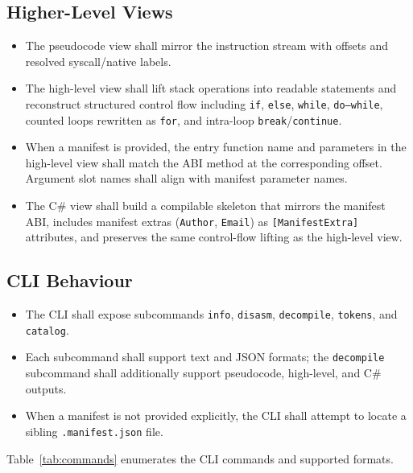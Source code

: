 \documentclass[11pt]{article}
\begin{document}
\subsection{Higher-Level Views}
\begin{itemize}[nosep]
    \item The pseudocode view shall mirror the instruction stream with offsets
    and resolved syscall/native labels.
    \item The high-level view shall lift stack operations into readable
    statements and reconstruct structured control flow including \texttt{if},
    \texttt{else}, \texttt{while}, \texttt{do--while}, counted loops rewritten
    as \texttt{for}, and intra-loop \texttt{break}/\texttt{continue}.
    \item When a manifest is provided, the entry function name and parameters
    in the high-level view shall match the ABI method at the corresponding
    offset. Argument slot names shall align with manifest parameter names.
    \item The C\# view shall build a compilable skeleton that mirrors the
    manifest ABI, includes manifest extras (\texttt{Author}, \texttt{Email}) as
    \texttt{[ManifestExtra]} attributes, and preserves the same control-flow
    lifting as the high-level view.
\end{itemize}

\subsection{CLI Behaviour}
\begin{itemize}[nosep]
    \item The CLI shall expose subcommands \texttt{info}, \texttt{disasm},
    \texttt{decompile}, \texttt{tokens}, and \texttt{catalog}.
    \item Each subcommand shall support text and JSON formats; the
    \texttt{decompile} subcommand shall additionally support pseudocode,
    high-level, and C\# outputs.
    \item When a manifest is not provided explicitly, the CLI shall attempt to
    locate a sibling \texttt{.manifest.json} file.
\end{itemize}

Table~\ref{tab:commands} enumerates the CLI commands and supported formats.
\end{document}
